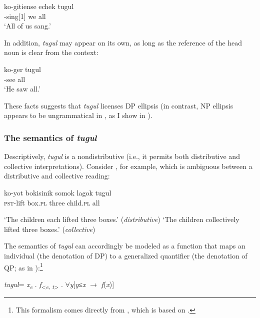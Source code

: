 \documentclass[output=paper,newtxmath,modfonts,nonflat,hidelinks]{langsci/langscibook}
\begin{document}
\ea \label{ex:landman:tugulpronoun}
    \gll ko-gitiense echek tugul\\ 
	     {\PST}-sing[1\PL] we all\\ 
    \glt ‘All of us sang.’
\z

 In addition, \textit{tugul} may appear on its own, as long as the reference of the head noun is clear from the context:

\ea \label{ex:landman:tugulonown}
    \gll ko-ger tugul\\ 
	     {\PST}-see all\\
    \glt ‘He saw all.’
\z 

These facts suggests that \textit{tugul} licenses DP ellipsis (in contrast, NP ellipsis appears to be ungrammatical in , as I show in ).

\subsubsection{The semantics of \textit{tugul}}\label{sec:landman:tugulsem}
Descriptively, \textit{tugul} is a nondistributive  (i.e., it permits both distributive and collective interpretations). Consider , for example, which is ambiguous between a distributive and collective reading:
 
\newpage  
\ea \label{ex:landman:distcoll}
    \gll ko-yot bokisinik somok lagok tugul\\
         \textsc{pst}-lift box.\textsc{pl} three child.\textsc{pl} all\\ 
    \glt 
      \begin{xlist}
      \ex \label{ex:landman:dist} ‘The children each lifted three boxes.’ (\textit{distributive})
      \ex \label{ex:landman:coll} ‘The children collectively lifted three boxes.’ (\textit{collective})
      \end{xlist}
\z

The semantics of \textit{tugul} can accordingly be modeled as a function that maps an individual (the denotation of DP) to a generalized quantifier (the denotation of QP; as in \citealt{Matthewson:2001}):\footnote{This formalism comes directly from \citet{Zimmermann:2014}, which is based on \citet{Matthewson:2001}.} 

\ea \label{ex:landman:tugulden}
\textlbrackdbl\textit{tugul}\textrbrackdbl = \textlambda\textit{x}\textsubscript{\textit{e}} .  \textlambda\textit{f}\textsubscript{<\textit{e}, \textit{t}>} . $\forall$\textit{y}[\textit{y}≤\textit{x} $\rightarrow$ \textit{f}(\textit{x})]
\z
\end{document}
